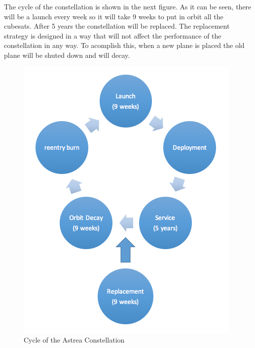 The cycle of the constellation is shown in the next figure. As it can be seen, there will be a launch every week so it will take 9 weeks to put in orbit all the cubesats. After 5 years the constellation will be replaced. The replacement strategy is designed in a way that will not affect the performance of the constellation in any way. To acomplish this, when a new plane is placed the old plane will be shuted down and will decay.    
\begin{figure}[H]
\begin{center}
\includegraphics[scale=0.6]{Diagrama.png} 
\caption{Cycle of the Astrea Constellation}
\end{center}
\end{figure}


